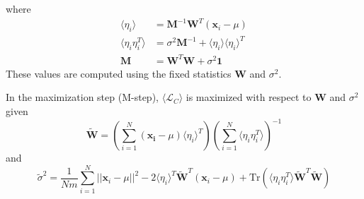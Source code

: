 \documentclass{article}
\numberwithin{equation}{section}
\begin{document}
where 
\begin{align}
        \langle \eta_i \rangle &= \mathbf{M}^{-1} \mathbf{W}^{T} (\mathbf{x}_i - \mu) \\
        \langle \eta_i \eta_i^T \rangle &= \sigma^2 \mathbf{M}^{-1} + \langle \eta_i \rangle 
        \langle \eta_i \rangle^{T} \\
        \mathbf{M} &= \mathbf{W}^{T} \mathbf{W} + \sigma^2 \mathbf{1}
\end{align}
These values are computed using the fixed statistics $\mathbf{W}$ and $\sigma^2$.

In the maximization step (M-step), $\langle \mathcal{L}_C \rangle$ is maximized with respect 
to $\mathbf{W}$ and $\sigma^{2}$ given
$$
\tilde{\mathbf{W}} =  \left( \sum_{i = 1}^N (\mathbf{x_i} - \mu) \langle \eta_i \rangle^T \right)
\left( \sum_{i = 1}^N \langle \eta_i \eta_i^T \rangle \right)^{-1}
$$
and 
$$
\tilde{\sigma}^{2} = \frac{1}{N m} \sum_{i=1}^{N} ||\mathbf{x}_i - \mu||^2 
        - 2\langle \eta_i \rangle^T \tilde{\mathbf{W}}^T (\mathbf{x}_i - \mu) 
        + \text{Tr}(\langle \eta_i \eta_i^T\rangle \tilde{\mathbf{W}}^T \tilde{\mathbf{W}})
$$


        
        


        
\end{document}
